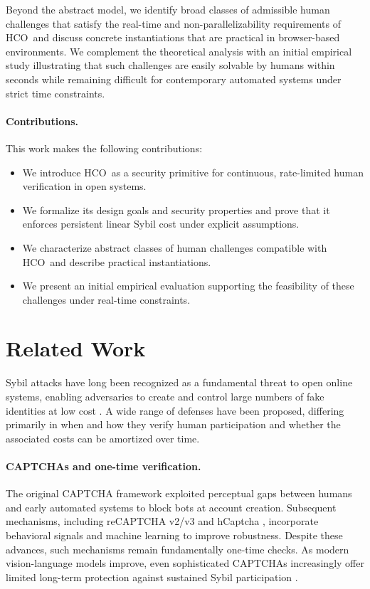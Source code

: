 \documentclass[11pt]{article}
\newcommand{\HCO}{HCO\xspace}
\begin{document}
Beyond the abstract model, we identify broad classes of admissible human challenges that satisfy the real-time and non-parallelizability requirements of \HCO\ and discuss concrete instantiations that are practical in browser-based environments. We complement the theoretical analysis with an initial empirical study illustrating that such challenges are easily solvable by humans within seconds while remaining difficult for contemporary automated systems under strict time constraints.

\paragraph{Contributions.}
This work makes the following contributions:
\begin{itemize}
	\item We introduce \HCO\ as a security primitive for continuous, rate-limited human verification in open systems.
	\item We formalize its design goals and security properties and prove that it enforces persistent linear Sybil cost under explicit assumptions.
	\item We characterize abstract classes of human challenges compatible with \HCO\ and describe practical instantiations.
	\item We present an initial empirical evaluation supporting the feasibility of these challenges under real-time constraints.
\end{itemize}


	
\section{Related Work}

Sybil attacks have long been recognized as a fundamental threat to open online systems, enabling adversaries to create and control large numbers of fake identities at low cost \cite{douceur2002sybil}. A wide range of defenses have been proposed, differing primarily in when and how they verify human participation and whether the associated costs can be amortized over time.

\paragraph{CAPTCHAs and one-time verification.}
The original CAPTCHA framework \cite{vonahn2003captcha} exploited perceptual gaps between humans and early automated systems to block bots at account creation. Subsequent mechanisms, including reCAPTCHA v2/v3 \cite{reCAPTCHA2019} and hCaptcha \cite{hCaptcha2020}, incorporate behavioral signals and machine learning to improve robustness. Despite these advances, such mechanisms remain fundamentally one-time checks. As modern vision-language models improve, even sophisticated CAPTCHAs increasingly offer limited long-term protection against sustained Sybil participation \cite{geirhos2018generalisation,brendel2019approximating}.
\end{document}
